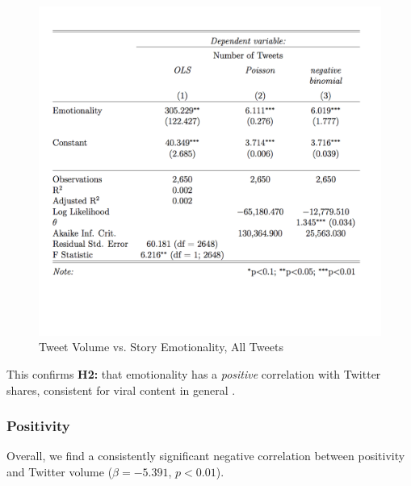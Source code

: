 \documentclass[letterpaper]{article}
\begin{document}
\begin{figure}[t!]  
\centering 
  \includegraphics[width=1.0\columnwidth]{emot-table}  
  \caption{Tweet Volume vs. Story Emotionality, All Tweets
    \label{fig:emot-table}}
\end{figure}


This confirms \textbf{H2:} that emotionality has a \emph{positive} correlation with Twitter shares, consistent for viral content in general \cite{berger2012makes}.

 
\subsubsection{Positivity}
Overall, we find a consistently significant negative correlation between positivity and Twitter volume ($\beta=−5.391$, $p<0.01$). 
 
\end{document}
